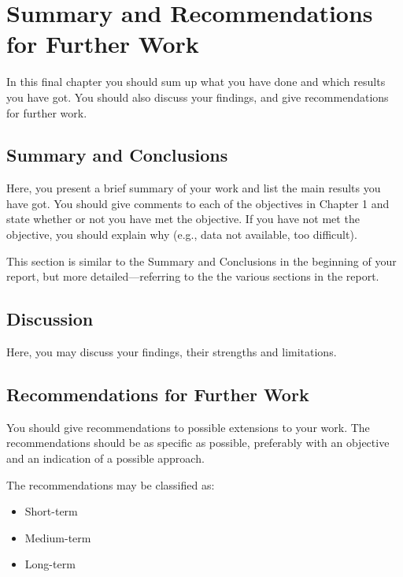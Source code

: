 \chapter[Summary]{Summary and Recommendations for Further Work}

In this final chapter you should sum up what you have done and which results you have got. You should also discuss your findings, and give recommendations for further work.

\section{Summary and Conclusions}
Here, you present a brief summary of your work and list the main results you have got. You should give comments to each of the objectives in Chapter 1 and state whether or not you have met the objective. If you have not met the objective, you should explain why (e.g., data not available, too difficult).

This section is similar to the Summary and Conclusions in the beginning of your report, but more detailed---referring to the the various sections in the report.

\section{Discussion}
Here, you may discuss your findings, their strengths and limitations.
\section{Recommendations for Further Work}
You should give recommendations to possible extensions to your work. The recommendations should be as specific as possible, preferably with an objective and an indication of a possible approach.

The recommendations may be classified as:
\begin{itemize}
\item Short-term
\item Medium-term
\item Long-term
\end{itemize}